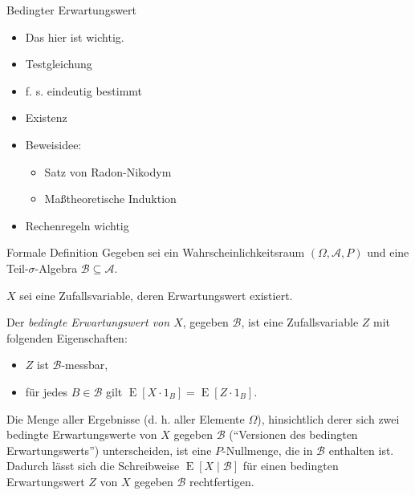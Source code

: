\begin{info}{Bedingter Erwartungswert}
    \begin{itemize}
        \item Das hier ist wichtig.
        \item Testgleichung
        \item f. s. eindeutig bestimmt
        \item Existenz
        \item Beweisidee:
              \begin{itemize}
                  \item Satz von Radon-Nikodym
                  \item Maßtheoretische Induktion
              \end{itemize}
        \item Rechenregeln wichtig
    \end{itemize}
\end{info}

\begin{defi}{Formale Definition}
    Gegeben sei ein Wahrscheinlichkeitsraum $(\Omega, \mathcal{A}, P)$ und eine Teil-$\sigma$-Algebra $\mathcal{B} \subseteq \mathcal{A}$.

    $X$ sei eine Zufallsvariable, deren Erwartungswert existiert.

    Der \emph{bedingte Erwartungswert von $X$}, gegeben $\mathcal{B}$, ist eine Zufallsvariable $Z$ mit folgenden Eigenschaften:
    \begin{itemize}
        \item $Z$ ist $\mathcal{B}$-messbar,
        \item für jedes $B \in \mathcal{B}$ gilt $\operatorname{E} [X \cdot 1_B] = \operatorname{E} [Z \cdot 1_B]$.
    \end{itemize}
    Die Menge aller Ergebnisse (d. h. aller Elemente $\Omega$), hinsichtlich derer sich zwei bedingte Erwartungswerte von $X$ gegeben $\mathcal{B}$ (\enquote{Versionen des bedingten Erwartungswerts}) unterscheiden, ist eine $P$-Nullmenge, die in $\mathcal{B}$ enthalten ist.
    Dadurch lässt sich die Schreibweise $\operatorname{E} [X \mid \mathcal{B}]$ für einen bedingten Erwartungswert $Z$ von $X$ gegeben $\mathcal{B}$ rechtfertigen.
\end{defi}


